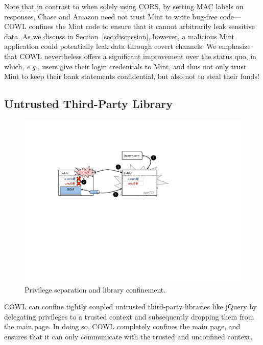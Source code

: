Note that in contrast to when solely using CORS, by setting MAC labels
on responses, Chase and Amazon need not trust Mint to write bug-free
code---COWL confines the Mint code to ensure that it cannot
arbitrarily leak sensitive data. As we discuss
in Section~\ref{sec:discussion}, however, a malicious Mint application
could potentially leak data through covert channels.  We emphasize
that COWL nevertheless offers a significant improvement over the
status quo, in which, \emph{e.g.,} users give their login credentials
to Mint, and thus not only trust Mint to keep their bank statements
confidential, but also not to steal their funds!

\subsection{Untrusted Third-Party Library}
\label{sec:apps-third-party}

\begin{figure}
\centerline{\includegraphics[width=\columnwidth]{jquery}}
\caption{\label{fig:jquery} Privilege separation and library
confinement.}
\end{figure}

COWL can confine tightly coupled untrusted third-party libraries like
jQuery by delegating privileges to a trusted context and subsequently
dropping them from the main page. In doing so, COWL completely
confines the main page, and ensures that it can only communicate with
the trusted and unconfined context.

